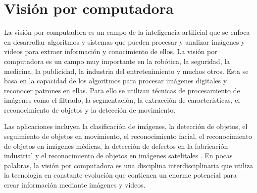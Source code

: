 \section{Visión por computadora}
La visión por computadora es un campo de la inteligencia artificial que se enfoca en desarrollar algoritmos y sistemas que pueden procesar y analizar imágenes y videos para extraer información y conocimiento de ellos. La visión por computadora es un campo muy importante en la robótica, la seguridad, la medicina, la publicidad, la industria del entretenimiento y muchos otros. Esta se basa en la capacidad de los algoritmos para procesar imágenes digitales y reconocer patrones en ellas. Para ello se utilizan técnicas de procesamiento de imágenes como el filtrado, la segmentación, la extracción de características, el reconocimiento de objetos y la detección de movimiento.

Las aplicaciones incluyen la clasificación de imágenes, la detección de objetos, el seguimiento de objetos en movimiento, el reconocimiento facial, el reconocimiento de objetos en imágenes médicas, la detección de defectos en la fabricación industrial y el reconocimiento de objetos en imágenes satelitales \cite{szeliski2010computer}.
En pocas palabras, la visión por computadora es una disciplina interdisciplinaria que utiliza la tecnología en constante evolución que contienen un enorme potencial para crear información mediante imágenes y videos.


